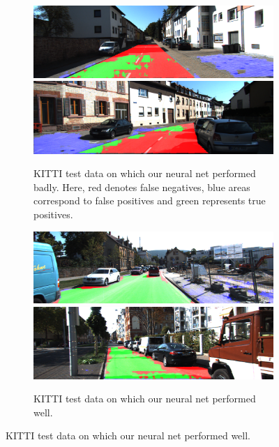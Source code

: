 \begin{figure}[]
    \begin{subfigure}[t]{\columnwidth}
        \includegraphics[width=\columnwidth]{figures/kitti_eval/Persp_um_road_000077.png}
        \includegraphics[width=\columnwidth]{figures/kitti_eval/Persp_um_road_000095.png}
        \caption{KITTI test data on which our neural net performed badly. Here, red denotes false negatives, blue areas correspond to false positives and green represents true positives.}%
\label{fig:sfig1}
    \end{subfigure}
    \begin{subfigure}[t]{\columnwidth}
        \includegraphics[width=\columnwidth]{figures/kitti_eval/Persp_uu_road_000027.png}
        \includegraphics[width=\columnwidth]{figures/kitti_eval/Persp_uu_road_000082.png}
        \caption{KITTI test data on which our neural net performed well.}%
\label{fig:sfig2}
    \end{subfigure}
\end{figure}

